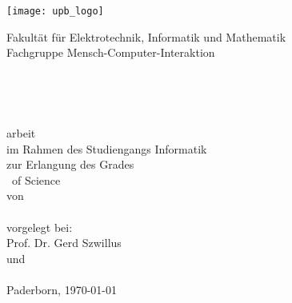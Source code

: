 
\thispagestyle{empty}
\begin{titlepage}
\begin{center}

	\begin{minipage}{14cm}		
		\hspace*{1.9cm}
		\texttt{[image: upb\_logo]}\\
		\begin{minipage}{9.5cm}
			\vspace*{5pt}
			\textsf{\noindent
			Fakultät für Elektrotechnik, Informatik und Mathematik\\
			Fachgruppe Mensch-Computer-Interaktion
			}
		\end{minipage}		
	\end{minipage}\\[60pt]
	
	\begin{doublespace}
		{\Huge\textbf{\Title}}\\[30pt]
	\end{doublespace} 
	
	{\Large 
			\Degree arbeit
	}\\[6pt]
			im Rahmen des Studiengangs Informatik\\
			zur Erlangung des Grades
		\\[6pt]
  	{\Large \Degree\ of Science}\\[54pt] %
	
		von\\
	{\scshape\large \Author}\\[54pt]
	
		vorgelegt bei:\\
	
	{\large Prof. Dr. Gerd Szwillus \\
		und
	\\[6pt]
	\large \SecondExaminer}\\[30pt]

	{Paderborn, \today}
	
\end{center}
\end{titlepage}
\clearpage
